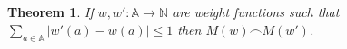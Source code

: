 \documentclass[journal]{IEEEtran}
\newtheorem{theorem}{Theorem}
\begin{document}
%



\vfill \pagebreak

\appendices

\section{}\label{weights-appendix}

\begin{theorem} \label{weights-nearly-equal} If $w, w' : \mathbb A \to \mathbb
N$ are weight functions such that $\sum_{a \in \mathbb A} |w'(a) - w(a)| \le 1$
then $M(w) \frown M(w')$.  \end{theorem}
\end{document}
